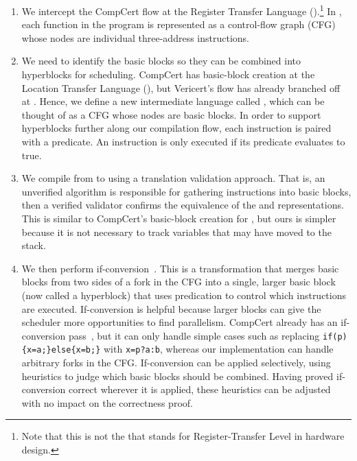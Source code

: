 \begin{enumerate}[label=\protect\blacknum{\arabic*}]
\item We intercept the CompCert flow at the Register Transfer
  Language (\rtl).\footnote{Note that this is not the \rtl{} that stands for
    Register-Transfer Level in hardware design.} In \rtl, each function in the
  program is represented as a control-flow graph (CFG) whose nodes are
  individual three-address instructions.
\item We need to identify the basic blocks so they can be combined into
  hyperblocks for scheduling. CompCert has basic-block creation at the Location
  Transfer Language (\ltl), but Vericert's flow has already branched off at
  \rtl. Hence, we define a new intermediate language called \rtlblock, which can
  be thought of as a CFG whose nodes are basic blocks. In order to support
  hyperblocks further along our compilation flow, each instruction is paired
  with a predicate. An instruction is only executed if its predicate evaluates
  to true.
\item We compile from \rtl{} to \rtlblock{} using a \gls{translation validation}
  approach. That is, an unverified algorithm is responsible for gathering
  instructions into basic blocks, then a verified validator confirms the
  equivalence of the \rtl{} and \rtlblock{} representations.  This is similar to
  CompCert's basic-block creation for \ltl{}, but ours is simpler because it is
  not necessary to track variables that may have moved to the stack.
\item We then perform
  if-conversion~\cite{allen83_conver_contr_depen_data_depen}. This is a
  transformation that merges basic blocks from two sides of a fork in the CFG
  into a single, larger basic block (now called a hyperblock) that uses
  predication to control which instructions are executed. If-conversion is
  helpful because larger blocks can give the scheduler more opportunities to
  find parallelism.
  CompCert already has an if-conversion pass~\cite{absint19_compc}, but it can
  only handle simple cases such as replacing \texttt{if(p)\{x=a;\}else\{x=b;\}}
  with \texttt{x=p?a:b}, whereas our implementation can handle arbitrary forks
  in the CFG.  If-conversion can be applied selectively, using heuristics to
  judge which basic blocks should be combined. Having proved if-conversion
  correct wherever it is applied, these heuristics can be adjusted with no
  impact on the correctness proof.

\end{enumerate}

